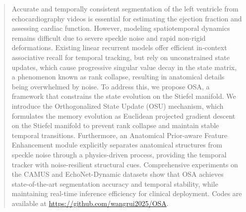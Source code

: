 \begin{abstract}
Accurate and temporally consistent segmentation of the left ventricle from echocardiography videos is essential for estimating the ejection fraction and assessing cardiac function. However, modeling spatiotemporal dynamics remains difficult due to severe speckle noise and rapid non-rigid deformations. Existing linear recurrent models offer efficient in-context associative recall for temporal tracking, but rely on unconstrained state updates, which cause progressive singular value decay in the state matrix, a phenomenon known as rank collapse, resulting in anatomical details being overwhelmed by noise. To address this, we propose OSA, a framework that constrains the state evolution on the Stiefel manifold. We introduce the Orthogonalized State Update (OSU) mechanism, which formulates the memory evolution as Euclidean projected gradient descent on the Stiefel manifold to prevent rank collapse and maintain stable temporal transitions. Furthermore, an Anatomical Prior-aware Feature Enhancement module explicitly separates anatomical structures from speckle noise through a physics-driven process, providing the temporal tracker with noise-resilient structural cues. Comprehensive experiments on the CAMUS and EchoNet-Dynamic datasets show that OSA achieves state-of-the-art segmentation accuracy and temporal stability, while maintaining real-time inference efficiency for clinical deployment. Codes are available at \url{https://github.com/wangrui2025/OSA}.
\end{abstract}